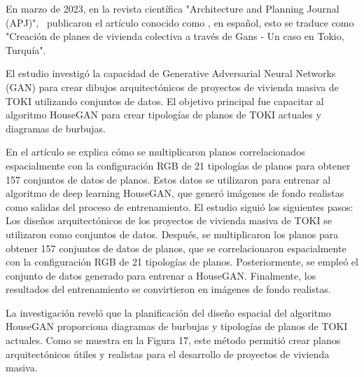 \newpage
En marzo de 2023, en la revista científica "Architecture and Planning Journal (APJ)", \cite{pr_ozerol2023genermass} publicaron el artículo conocido como , en español, esto se traduce como "Creación de planes de vivienda colectiva a través de Gans - Un caso en Tokio, Turquía".

El estudio investigó la capacidad de Generative Adversarial Neural Networks (GAN) para crear dibujos arquitectónicos de proyectos de vivienda masiva de TOKI utilizando conjuntos de datos. El objetivo principal fue capacitar al algoritmo HouseGAN para crear tipologías de planos de TOKI actuales y diagramas de burbujas.

En el artículo se explica cómo se multiplicaron planos correlacionados espacialmente con la configuración RGB de 21 tipologías de planos para obtener 157 conjuntos de datos de planos. Estos datos se utilizaron para entrenar al algoritmo de deep learning HouseGAN, que generó imágenes de fondo realistas como salidas del proceso de entrenamiento. El estudio siguió los siguientes pasos: Los diseños arquitectónicos de los proyectos de vivienda masiva de TOKI se utilizaron como conjuntos de datos. Después, se multiplicaron los planos para obtener 157 conjuntos de datos de planos, que se correlacionaron espacialmente con la configuración RGB de 21 tipologías de planos. Posteriormente, se empleó el conjunto de datos generado para entrenar a HouseGAN. Finalmente, los resultados del entrenamiento se convirtieron en imágenes de fondo realistas.

La investigación reveló que la planificación del diseño espacial del algoritmo HouseGAN proporciona diagramas de burbujas y tipologías de planos de TOKI actuales. Como se muestra en la Figura 17, este método permitió crear planos arquitectónicos útiles y realistas para el desarrollo de proyectos de vivienda masiva.

